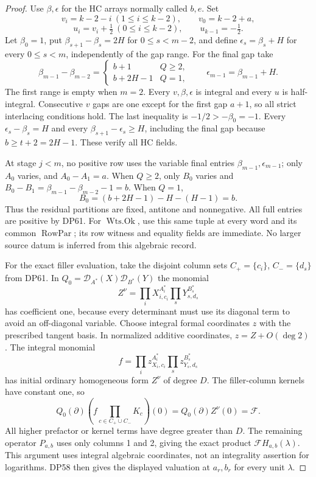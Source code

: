 \documentclass[11pt,a4paper]{article}
\theoremstyle{definition}\newtheorem{remark}[theorem]{Remark}
\begin{document}
\begin{proof}
Use $\beta,\epsilon$ for the HC arrays normally called $b,e$.
Set
\[
 v_i=k-2-i\ (1\le i\le k-2),\qquad v_0=k-2+a,
\]
\[
 u_i=v_i+\tfrac12\ (0\le i\le k-2),\qquad u_{k-1}=-\tfrac12.
\]
Let $\beta_0=1$, put $\beta_{s+1}-\beta_s=2H$ for $0\le s<m-2$,
and define $\epsilon_s=\beta_s+H$ for every $0\le s<m$, independently
of the gap range. For the final gap take
\[
 \beta_{m-1}-\beta_{m-2}=
 \begin{cases}b+1&Q\ge2,\\b+2H-1&Q=1,\end{cases}
 \qquad\epsilon_{m-1}=\beta_{m-1}+H.
\]
The first range is empty when $m=2$. Every $v,\beta,\epsilon$ is
integral and every $u$ is half-integral. Consecutive $v$ gaps are one
except for the first gap $a+1$, so all strict interlacing conditions
hold. The last inequality is $-1/2>-\beta_0=-1$.
Every $\epsilon_s-\beta_s=H$ and every
$\beta_{s+1}-\epsilon_s\ge H$, including the final gap because
$b\ge t+2=2H-1$. These verify all HC fields.

At stage $j<m$, no positive row uses the variable final entries
$\beta_{m-1},\epsilon_{m-1}$; only $A_0$ varies, and
$A_0-A_1=a$. When $Q\ge2$, only $B_0$ varies and
$B_0-B_1=\beta_{m-1}-\beta_{m-2}-1=b$.
When $Q=1$,
\[
 B_0=(b+2H-1)-H-(H-1)=b.
\]
Thus the residual partitions are fixed, antitone and nonnegative.
All full entries are positive by DP61. For $\operatorname{Wts.Ok}$,
use this same tuple at every word and its common $\operatorname{RowPar}$;
its row witness and equality fields are immediate. No larger source
datum is inferred from this algebraic record.

For the exact filler evaluation, take the disjoint column sets
$C_+=\{c_i\}$, $C_-=\{d_s\}$ from DP61. In
$Q_0=\mathcal D_{A^*}(X)\mathcal D_{B^*}(Y)$ the monomial
\[
 Z^\nu=\prod_iX_{i,c_i}^{A_i^*}\prod_sY_{s,d_s}^{B_s^*}
\]
has coefficient one, because every determinant must use its diagonal
term to avoid an off-diagonal variable. Choose integral formal
coordinates $z$ with the prescribed tangent basis. In normalized
additive coordinates, $z=Z+O(\deg2)$. The integral monomial
\[
 f=\prod_i z_{X_i,c_i}^{A_i^*}\prod_s z_{Y_s,d_s}^{B_s^*}
\]
has initial ordinary homogeneous form $Z^\nu$ of degree $D$.
The filler-column kernels have constant one, so
\[
 Q_0(\partial)\left(f\prod_{c\in C_+\cup C_-}K_c\right)(0)
 =Q_0(\partial)Z^\nu(0)=\mathcal F.
\]
All higher prefactor or kernel terms have degree greater than $D$.
The remaining operator $P_{a,b}$ uses only columns 1 and 2, giving the
exact product $\mathcal F H_{a,b}(\lambda)$. This argument uses integral
algebraic coordinates, not an integrality assertion for logarithms.
DP58 then gives the displayed valuation at $a_r,b_r$ for every unit
$\lambda$.


\end{proof}
\end{document}
